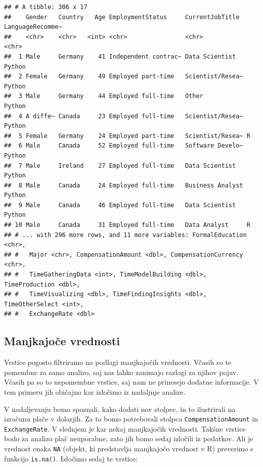 \documentclass[
]{book}
\begin{document}
\begin{verbatim}
## # A tibble: 306 x 17
##    Gender   Country   Age EmploymentStatus     CurrentJobTitle  LanguageRecomme~
##    <chr>    <chr>   <int> <chr>                <chr>            <chr>           
##  1 Male     Germany    41 Independent contrac~ Data Scientist   Python          
##  2 Female   Germany    49 Employed part-time   Scientist/Resea~ Python          
##  3 Male     Germany    44 Employed full-time   Other            Python          
##  4 A diffe~ Canada     23 Employed full-time   Scientist/Resea~ Python          
##  5 Female   Germany    24 Employed part-time   Scientist/Resea~ R               
##  6 Male     Canada     52 Employed full-time   Software Develo~ Python          
##  7 Male     Ireland    27 Employed full-time   Data Scientist   Python          
##  8 Male     Canada     24 Employed full-time   Business Analyst Python          
##  9 Male     Canada     46 Employed full-time   Data Scientist   Python          
## 10 Male     Canada     31 Employed full-time   Data Analyst     R               
## # ... with 296 more rows, and 11 more variables: FormalEducation <chr>,
## #   Major <chr>, CompensationAmount <dbl>, CompensationCurrency <chr>,
## #   TimeGatheringData <int>, TimeModelBuilding <dbl>, TimeProduction <dbl>,
## #   TimeVisualizing <dbl>, TimeFindingInsights <dbl>, TimeOtherSelect <int>,
## #   ExchangeRate <dbl>
\end{verbatim}

\hypertarget{manjkajoux10de-vrednosti}{%
\subsection{Manjkajoče vrednosti}\label{manjkajoux10de-vrednosti}}

Vrstice pogosto filtriramo na podlagi manjkajočih vrednosti. Včasih so te pomembne za samo analizo, saj nas lahko zanimajo razlogi za njihov pojav. Včasih pa so to nepomembne vrstice, saj nam ne prinesejo dodatne informacije. V tem primeru jih običajno kar izločimo iz nadaljnje analize.

V nadaljevanju bomo spoznali, kako dodati nov stolpec, in to ilustrirali na izračunu plače v dolarjih. Za to bomo potrebovali stolpca \texttt{CompensationAmount} in \texttt{ExchangeRate}. V slednjem je kar nekaj manjkajočih vrednosti. Takšne vrstice bodo za analizo plač neuporabne, zato jih bomo sedaj izločili iz podatkov. Ali je vrednost enaka \texttt{NA} (objekt, ki predstavlja manjkajočo vrednost v R) preverimo s funkcijo \texttt{is.na()}. Izločimo sedaj te vrstice:
\end{document}
